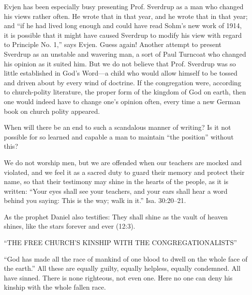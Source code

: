 Evjen has been especially busy presenting Prof. Sverdrup as a man who changed his views rather often. He wrote that in that year, and he wrote that in that year; and “if he had lived long enough and could have read Sohm’s new work of 1914, it is possible that it might have caused Sverdrup to modify his view with regard to Principle No. 1,” says Evjen. Guess again! Another attempt to present Sverdrup as an unstable and wavering man, a sort of Paul Turncoat who changed his opinion as it suited him. But we do not believe that Prof. Sverdrup was so little established in God’s Word—a child who would allow himself to be tossed and driven about by every wind of doctrine. If the congregation were, according to church-polity literature, the proper form of the kingdom of God on earth, then one would indeed have to change one’s opinion often, every time a new German book on church polity appeared.

When will there be an end to such a scandalous manner of writing? Is it not possible for so learned and capable a man to maintain “the position” without this?

We do not worship men, but we are offended when our teachers are mocked and violated, and we feel it as a sacred duty to guard their memory and protect their name, so that their testimony may shine in the hearts of the people, as it is written: “Your eyes shall see your teachers, and your ears shall hear a word behind you saying: This is the way; walk in it.” Isa. 30:20–21.

As the prophet Daniel also testifies: They shall shine as the vault of heaven shines, like the stars forever and ever (12:3).

“THE FREE CHURCH’S KINSHIP WITH THE CONGREGATIONALISTS”

“God has made all the race of mankind of one blood to dwell on the whole face of the earth.” All these are equally guilty, equally helpless, equally condemned. All have sinned. There is none righteous, not even one. Here no one can deny his kinship with the whole fallen race.

